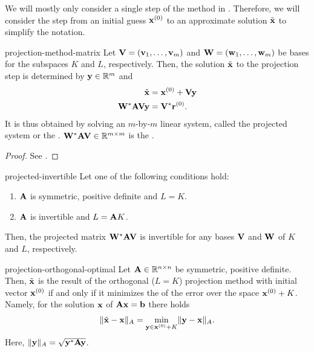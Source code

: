 \begin{notation}
  We will mostly only consider a single step of the method in
  . Therefore, we will consider
  the step from an initial guess $\mathbf x^{(0)}$ to an approximate solution
  $\tilde {\mathbf x}$ to simplify the notation.
\end{notation}

\begin{Definition}{projection-method-matrix}
  Let $\mathbf V=(\mathbf v_1,\dots,\mathbf v_m)$ and $\mathbf W=(\mathbf w_1,\dots,\mathbf w_m)$ be bases for
  the subspaces $K$ and $L$, respectively. Then, the solution
  $\tilde {\mathbf x}$ to the projection step is determined by $\mathbf y\in\mathbb R^m$ and
  \begin{align}
    \tilde{\mathbf x} &= \mathbf x^{(0)} + \mathbf V\mathbf y\\
    \mathbf W^*\mathbf A\mathbf V \mathbf y &= \mathbf V^* \mathbf r^{(0)}.
  \end{align}
  It is thus obtained by solving an $m$-by-$m$ linear system, called
  the projected system or the . $\mathbf W^*\mathbf A\mathbf V\in\mathbb R^{m\times m}$ is the
  .
\end{Definition}

\begin{proof}
  See \cite[Section 5.1.2]{Saad00}.
\end{proof}

\begin{Theorem}{projected-invertible}
  Let one of the following conditions hold:
  \begin{enumerate}
  \item $\mathbf A$ is symmetric, positive definite and $L=K$.
  \item $\mathbf A$ is invertible and $L = \mathbf A K$.
  \end{enumerate}
  Then, the projected matrix $\mathbf W^*\mathbf A\mathbf V$ is invertible for any
  bases $\mathbf V$ and $\mathbf W$ of $K$ and $L$, respectively.
\end{Theorem}

\begin{Theorem}{projection-orthogonal-optimal}
  Let $\mathbf A\in\mathbb R^{n\times n}$ be symmetric, positive definite. Then,
  $\tilde {\mathbf x}$ is the result of the orthogonal ($L=K$) projection
  method with initial vector $\mathbf x^{(0)}$ if and only if it minimizes
  the  of the error over the space $\mathbf x^{(0)}+K$. Namely, for the
  solution $\mathbf x$ of $\mathbf A\mathbf x=\mathbf b$ there holds
  \begin{gather}
    \lVert\tilde{\mathbf x}-\mathbf x\rVert_A = \min_{\mathbf y\in\mathbf x^{(0)}+K} \lVert\mathbf y-\mathbf x\rVert_A.
  \end{gather}
  Here, $\lVert\mathbf y\rVert_A = \sqrt{\mathbf y^*\mathbf A\mathbf y}$.
\end{Theorem}

